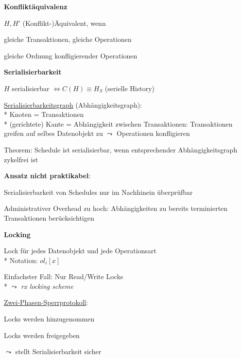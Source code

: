 \textbf{Konfliktäquivalenz}
\begin{items}
	\item \( H, H' \) (Konflikt-)Äquivalent, wenn
	\begin{enumeration}
		\item gleiche Transaktionen, gleiche Operationen
		\item gleiche Ordnung konfligierender Operationen
	\end{enumeration}
\end{items}

\textbf{Serialisierbarkeit}
\begin{items}
	\item \( H \) serialisierbar \( \Leftrightarrow C(H) \equiv H_S \) (serielle History)
	\item \underline{Serialisierbarkeitsgraph} (Abhängigkeitsgraph):
		\\*
		Knoten = Transaktionen
		\\*
		(gerichtete) Kante = Abhängigkeit zwischen Transaktionen: Transaktionen greifen auf selbes Datenobjekt zu \( \leadsto \) Operationen konfligieren
	\item Theorem: Schedule ist serialisierbar, wenn entsprechender Abhängigkeitsgraph zykelfrei ist
	\item \textbf{Ansatz nicht praktikabel}:
	\begin{enumeration}
		\item Serialisierbarkeit von Schedules nur im Nachhinein überprüfbar
		\item Administrativer Overhead zu hoch: Abhängigkeiten zu bereits terminierten Transaktionen berücksichtigen
	\end{enumeration}
\end{items}

\textbf{Locking}
\begin{items}
	\item Lock für jedes Datenobjekt und jede Operationsart
		\\*
		Notation: \( ol_i[x] \)
	\item Einfachster Fall: Nur Read/Write Locks
		\\*
		\( \leadsto \) \emph{rx locking scheme}
	\item \underline{Zwei-Phasen-Sperrprotokoll}:
	\begin{enumeration}
		\item Locks werden hinzugenommen
		\item Locks werden freigegeben
	\end{enumeration}
	\( \leadsto \) stellt Serialisierbarkeit sicher
\end{items}

